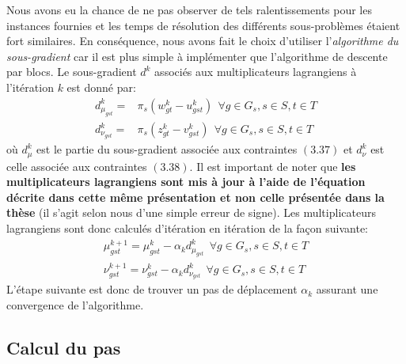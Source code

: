 Nous avons eu la chance de ne pas observer de tels ralentissements pour les instances fournies et les temps de résolution des différents
sous-problèmes étaient fort similaires. En conséquence, nous avons fait le choix d'utiliser l'\textit{algorithme du sous-gradient} car il est
plus simple à implémenter que l'algorithme de descente par blocs.
Le sous-gradient $d^k$ associés aux multiplicateurs lagrangiens à l'itération $k$ est donné par:
\begin{align}
    d_{\mu_{gst}}^k = & \pi_s (w_{gt}^k - u_{gst}^k) \ \  \forall g \in G_s, s \in S, t \in T \\
    d_{\nu_{gst}}^k = & \pi_s (z_{gt}^k - v_{gst}^k) \ \  \forall g \in G_s, s \in S, t \in T
\end{align}
où $d_{\mu}^k$ est le partie du sous-gradient associée aux contraintes $(3.37)$ et $d_{\nu}^k$ est celle associée aux contraintes $(3.38)$.
Il est important de noter que \textbf{les multiplicateurs lagrangiens sont mis à jour à l'aide de l'équation décrite dans cette même présentation
et non celle présentée dans la thèse} \citep{Papavasiliou12couplingrenewable} (il s'agit selon nous d'une simple erreur de signe).
Les multiplicateurs lagrangiens sont donc calculés d'itération en itération de la façon suivante:
\begin{align}
    \mu_{gst}^{k+1} = \mu_{gst}^{k} - \alpha_k d_{\mu_{gst}}^k \ \  \forall g \in G_s, s \in S, t \in T \\
    \nu_{gst}^{k+1} = \nu_{gst}^{k} - \alpha_k d_{\nu_{gst}}^k \ \  \forall g \in G_s, s \in S, t \in T
\end{align}
L'étape suivante est donc de trouver un pas de déplacement $\alpha_k$ assurant une convergence de l'algorithme.

\subsection{Calcul du pas}


